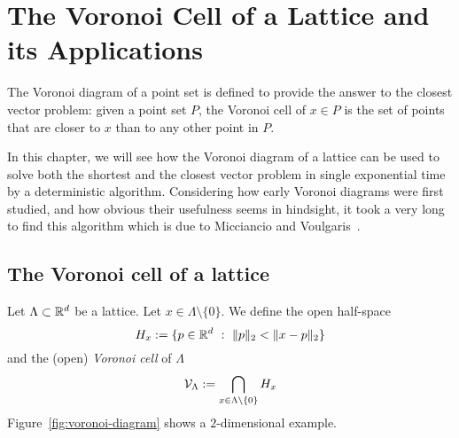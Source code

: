 %
%
%

\chapter{The Voronoi Cell of a Lattice and its Applications}
\label{chapter:voronoi-cell}

The Voronoi diagram of a point set is defined
to provide the answer to the closest vector problem:
given a point set $P$,
the Voronoi cell of $x \in P$ is the set of points
that are closer to $x$ than to any other point in $P$.

In this chapter, we will see how the Voronoi diagram of a lattice
can be used to solve both the shortest and the closest vector problem
in single exponential time by a deterministic algorithm.
Considering how early Voronoi diagrams were first studied,
and how obvious their usefulness seems in hindsight,
it took a very long to find this algorithm
which is due to Micciancio and Voulgaris~\cite{MR2743283}.


\section{The Voronoi cell of a lattice}

\begin{definition}
  Let $\Lambda \subset \mathbb{R}^d$ be a lattice.
  Let $x \in \Lambda \setminus \{ 0 \}$.
  We define the open half-space
  \[
    H_x := \{ p \in \mathbb{R}^d ~:~ \|p\|_2 < \|x-p\|_2 \}
  \]
  and the (open) \emph{Voronoi cell} of $\Lambda$
  \[
    \mathcal{V}_\Lambda := \bigcap_{x \in \Lambda\setminus\{0\}} H_x
  \]
  Figure~\ref{fig:voronoi-diagram} shows a $2$-dimensional example.
\end{definition}

